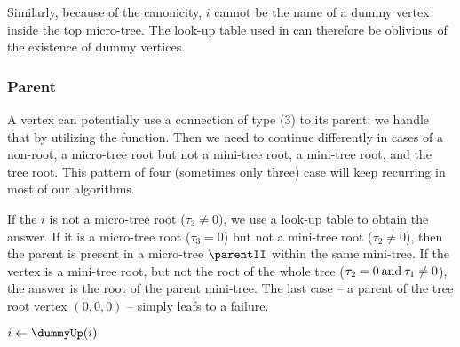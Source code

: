 Similarly, because of the canonicity, $i$ cannot be the name of a dummy vertex inside the top micro-tree.
The \degree{} look-up table used in \isLeaf{} can therefore be oblivious of the existence of dummy vertices.

\begin{algorithm}
\begin{algorithmic}
	\State {}
\EndFunction
\end{algorithmic}
\end{algorithm}

\begin{algorithm}
\begin{algorithmic}
	\State {}
\EndFunction
\end{algorithmic}
\end{algorithm}

\subsubsection{Parent}

A vertex can potentially use a connection of type (3) to its parent; we handle that by utilizing the \dummyUp{} function.
Then we need to continue differently in cases of a non-root, a micro-tree root but not a mini-tree root, a mini-tree root, and the tree root.
This pattern of four (sometimes only three) case will keep recurring in most of our algorithms.

If the $i$ is not a micro-tree root ($\tau_3 \ne 0$), we use a look-up table to obtain the answer.
If it is a micro-tree root ($\tau_3 = 0$) but not a mini-tree root ($\tau_2 \ne 0$), then the parent is present in a micro-tree $\parentII$ within the same mini-tree.
If the vertex is a mini-tree root, but not the root of the whole tree ($\tau_2 = 0 \mathbin{\textrm{and}} \tau_1 \ne 0$), the answer is the root of the parent mini-tree.
The last case -- a parent of the tree root vertex $(0, 0, 0)$ -- simply leafs to a failure.

\begin{algorithm}
\begin{algorithmic}
	\State $i \gets \dummyUp(i)$ 
	 
		\State {} 
	 
		\State {} 
	 
		\State {}
	\Else {}
		\State {}
	\EndIf
\EndFunction
\end{algorithmic}
\end{algorithm}

